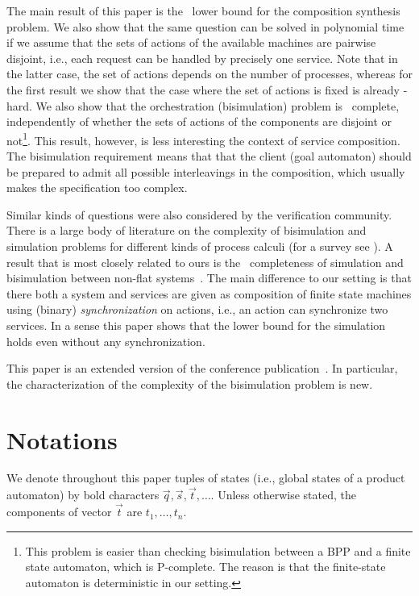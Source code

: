 \documentclass{LMCS}
\theoremstyle{plain}\newtheorem{remark}{Remark}
\theoremstyle{plain}\newtheorem{lemma}[thm]{Lemma}
\begin{document}
The main result of this paper is the \EXPTIME\ lower bound for the
composition synthesis problem. We also show that the same question can
be solved in polynomial time if we assume that the sets of actions of
the available machines are pairwise disjoint, i.e., each request can
be handled by precisely one service. Note that in the latter case, the
set of actions depends on the number of processes, whereas for the
first result we show that the case where the set of actions is fixed
is already \EXPTIME-hard. We also show that the orchestration
(bisimulation) problem
is \NLOGSPACE\ complete, independently of whether the sets of actions
of the components are disjoint or not\footnote{This problem is easier
  than checking bisimulation between a BPP and a finite state
  automaton, which is P-complete. The reason is that the finite-state
automaton is deterministic in our setting.}. This result, however, is less
interesting the context of service composition. The bisimulation
requirement means that that the client (goal automaton) should be
prepared to admit all possible interleavings in the composition, which
usually makes the specification too complex.

Similar kinds of questions were also considered by the verification
community. There is a large body of literature on the complexity of
bisimulation and simulation problems for different kinds of process
calculi (for a survey see \cite{Srba}). A result that is most closely
related to ours is the 
\EXPTIME\ completeness of simulation and bisimulation between non-flat
systems~\cite{LarSch00}. The main difference to our setting is that
there both a system and services are given as composition of finite state
machines using (binary) \emph{synchronization} on actions, i.e., an
action can synchronize two services. In a sense this paper shows that
the lower bound for the simulation holds even without any
synchronization.  

This paper is an extended version of the conference
publication~\cite{mw07}. In particular, the
characterization of the complexity of the bisimulation problem is new.


\section{Notations}
We denote throughout this paper tuples of states (i.e., global states
of a product automaton)  by bold characters
$\vec q, \vec s, \vec t, \dots$. Unless otherwise stated, the
components of  vector $\vec t$ are $t_1,\ldots,t_n$.
\end{document}
